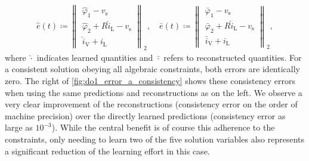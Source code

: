 \documentclass[AMA,STIX1COL]{WileyNJD-v2}
\newcommand{\mr}[1]{\mathrm{#1}}
\begin{document}
\begin{align*}
    \hat{e}(t) \coloneqq \begin{Vmatrix}
        \hat{\varphi}_1 - v_\mr{s}\\
        \hat{\varphi}_2 + R \hat{i}_\mr{L} - v_\mr{s}\\
        \hat{i}_\mr{V} + i_\mr{L}
    \end{Vmatrix}_2, \quad \bar{e}(t) \coloneqq \begin{Vmatrix}
        \bar{\varphi}_1 - v_\mr{s}\\
        \bar{\varphi}_2 + R \hat{i}_\mr{L} - v_\mr{s}\\
        \bar{i}_\mr{V} + i_\mr{L}
    \end{Vmatrix}_2,
\end{align*}
where $\hat{\cdot}$ indicates learned quantities and $\bar{\cdot}$ refers to reconstructed quantities. For a consistent solution obeying all algebraic constraints, both errors are identically zero. The right of \autoref{fig:do1_error_a_consistency} shows these consistency errors when using the same predictions and reconstructions as on the left. We observe a very clear improvement of the reconstructions (consistency error on the order of machine precision) over the directly learned predictions (consistency error as large as $10^{-3}$). While the central benefit is of course this adherence to the constraints, only needing to learn two of the five solution variables also represents a significant reduction of the learning effort in this case.
\end{document}
